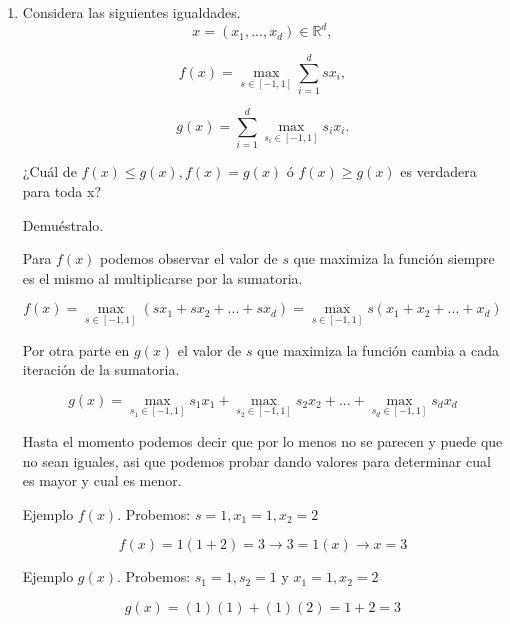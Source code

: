 \documentclass[12pt]{exam}
\begin{document}
\begin{enumerate}
\begin{enumerate}[label=a.]
\end{enumerate}

\begin{enumerate}[label=b.]
\item Considera las siguientes igualdades.
\begin{equation}
    x = (x_1,...,x_d)\in \mathbb{R}^d,
\end{equation}

\begin{equation}
    f(x) = \max_{s\in[-1,1]} \sum_{i=1}^d sx_i,
\end{equation}

\begin{equation}
    g(x) = \sum_{i=1}^d \max_{s_i\in[-1,1]} s_ix_i.
\end{equation}

\justify
\mbox{¿}Cu\'al de $f(x) \leq g(x), f(x) = g(x)$ \'o $f(x) \geq g(x)$ es verdadera para toda x?

\justify
Demu\'estralo.

\justify
Para $f(x)$ podemos observar el valor de $s$ que maximiza la funci\'on siempre es el mismo al multiplicarse por la sumatoria.

\begin{equation}
    f(x) = \max_{s\in[-1,1]} (sx_1 + sx_2 + ... + sx_d) = \max_{s\in[-1,1]} s(x_1 + x_2 + ... + x_d)
\end{equation}

\justify
Por otra parte en $g(x)$ el valor de $s$ que maximiza la funci\'on cambia a cada iteraci\'on de la sumatoria.

\begin{equation}
    g(x) = \max_{s_1\in[-1,1]} s_1x_1 + \max_{s_2\in[-1,1]} s_2x_2 + ... + \max_{s_d\in[-1,1]} s_dx_d
\end{equation}

\justify
Hasta el momento podemos decir que por lo menos no se parecen y puede que no sean iguales, asi que podemos probar dando valores para determinar cual es mayor y cual es menor.

\justify
Ejemplo $f(x)$. Probemos: $s=1, x_1 = 1, x_2 = 2$

\begin{equation}
    f(x) = 1(1+2) = 3 \rightarrow 3 = 1(x) \rightarrow x = 3
\end{equation}

\justify
Ejemplo $g(x)$. Probemos: $s_1=1, s_2=1$ y $x_1=1, x_2 = 2$

\begin{equation}
    g(x) = (1)(1) + (1)(2) = 1 + 2 = 3
\end{equation}


\end{enumerate}
\end{enumerate}
\end{document}
